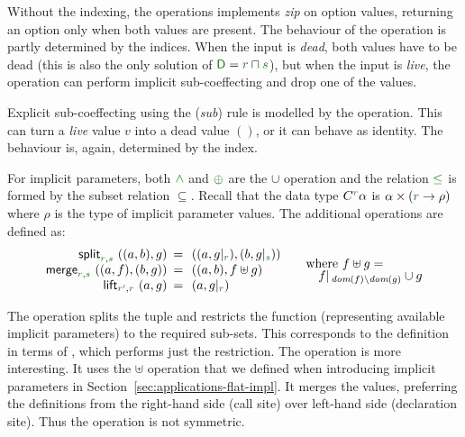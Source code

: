 \noindent
Without the indexing, the  operations implements \emph{zip} on option values,
returning an option only when both values are present. The behaviour of the  
operation is partly determined by the indices. When the input is \emph{dead}, both values have 
to be dead (this is also the only solution of $\cclrd{\ident{D}} =\cclrd{r}\sqcap\cclrd{s}$), but when
the input is \emph{live}, the operation can perform implicit sub-coeffecting and drop one of
the values.

Explicit sub-coeffecting using the (\emph{sub}) rule is modelled by the  operation.
This can turn a \emph{live} value $v$ into a dead value $()$, or it can behave as identity.
The behaviour is, again, determined by the index.

\begin{example}
For implicit parameters, both $\czip$ and $\cpar$ are the $\cup$ operation and the relation
$\cleq$ is formed by the subset relation $\subseteq$. Recall that the data type $\ctyp{\cclrd{r}}{\alpha}$
is $\alpha \times (\cclrd{r} \rightarrow \rho)$ where $\rho$ is the type of implicit parameter values.
The additional operations are defined as:
%
\begin{equation*}
\begin{array}{rcl}
\ident{split}_{\cclrd{r}, \cclrd{s}}~((a,b), g) &\narrow{=}& ((a, \restr{g}{\cclrd{r}}), (b, \restr{g}{\cclrd{s}}))\\
\ident{merge}_{\cclrd{r}, \cclrd{s}}~((a, f), (b, g)) &\narrow{=}& ((a, b), f \uplus g)\\
\ident{lift}_{\cclrd{r'}, \cclrd{r}}~(a, g) &\narrow{=}& (a, \restr{g}{\cclrd{r}})\\
\end{array}
\quad
\begin{array}{l}
\textnormal{where}~f \uplus g = \\[-0.25em]
\quad\restr{f}{\, \textit{dom}(f) \setminus \textit{dom}(g)} \cup g 
\end{array}
\end{equation*}
\end{example}

\noindent
The  operation splits the tuple and restricts the function (representing available
implicit parameters) to the required sub-sets. This corresponds to the definition in terms
of , which performs just the restriction. The  operation is more 
interesting. It uses the $\uplus$ operation that we defined when introducing implicit parameters
in Section~\ref{sec:applications-flat-impl}. It merges the values, preferring the definitions from
the right-hand side (call site) over left-hand side (declaration site). Thus the operation is not
symmetric.

